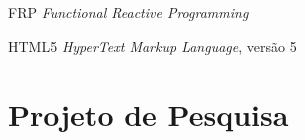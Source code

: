 \documentclass[
  12pt,         %
  a4paper,      %
  oneside,
  sumario=tradicional,%
  chapter=TITLE,      %
  section=TITLE,
  english,      %
  brazil,       %
  ]{abntex2}
\begin{document}

\frenchspacing


\imprimircapa
\imprimirfolhaderosto



\begin{siglas}
  \item[FRP] \emph{Functional Reactive Programming}
  \item[HTML5] \emph{HyperText Markup Language}, versão 5
\end{siglas}

{\center\tableofcontents*}
\cleardoublepage

\textual


\chapter*{Projeto de Pesquisa}












\postextual



\printindex
\end{document}
